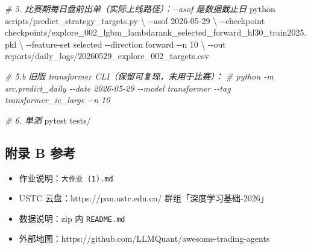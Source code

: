\documentclass[
  fontset=fandol]{ctexart}
\newenvironment{Shaded}{\begin{snugshade}}{\end{snugshade}}
\newcommand{\AttributeTok}[1]{\textcolor[rgb]{0.77,0.63,0.00}{#1}}
\newcommand{\CommentTok}[1]{\textcolor[rgb]{0.56,0.35,0.01}{\textit{#1}}}
\newcommand{\DataTypeTok}[1]{\textcolor[rgb]{0.13,0.29,0.53}{#1}}
\newcommand{\ExtensionTok}[1]{#1}
\newcommand{\NormalTok}[1]{#1}
\providecommand{\tightlist}{%
  \setlength{\itemsep}{0pt}\setlength{\parskip}{0pt}}
\begin{document}
\begin{Shaded}
\begin{Highlighting}[]
\CommentTok{\# 5. 比赛期每日盘前出单（实际上线路径）：{-}{-}asof 是数据截止日}
\ExtensionTok{python}\NormalTok{ scripts/predict\_strategy\_targets.py }\DataTypeTok{\textbackslash{}}
  \AttributeTok{{-}{-}asof}\NormalTok{ 2026{-}05{-}29 }\DataTypeTok{\textbackslash{}}
  \AttributeTok{{-}{-}checkpoint}\NormalTok{ checkpoints/explore\_002\_lgbm\_lambdarank\_selected\_forward\_hl30\_train2025.pkl }\DataTypeTok{\textbackslash{}}
  \AttributeTok{{-}{-}feature{-}set}\NormalTok{ selected }\AttributeTok{{-}{-}direction}\NormalTok{ forward }\AttributeTok{{-}{-}n}\NormalTok{ 10 }\DataTypeTok{\textbackslash{}}
  \AttributeTok{{-}{-}out}\NormalTok{ reports/daily\_logs/20260529\_explore\_002\_targets.csv}

\CommentTok{\# 5.b 旧版 transformer CLI（保留可复现，未用于比赛）：}
\CommentTok{\# python {-}m src.predict\_daily {-}{-}date 2026{-}05{-}29 {-}{-}model transformer {-}{-}tag transformer\_ic\_large {-}{-}n 10}

\CommentTok{\# 6. 单测}
\ExtensionTok{pytest}\NormalTok{ tests/}
\end{Highlighting}
\end{Shaded}

\hypertarget{ux9644ux5f55-b-ux53c2ux8003}{%
\subsection{附录 B
参考}\label{ux9644ux5f55-b-ux53c2ux8003}}

\begin{itemize}
\tightlist
\item
  作业说明：\texttt{大作业\ (1).md}
\item
  USTC 云盘：https://pan.ustc.edu.cn/
  群组「深度学习基础-2026」
\item
  数据说明：zip 内 \texttt{README.md}
\item
  外部地图：https://github.com/LLMQuant/awesome-trading-agents
\end{itemize}
\end{document}
